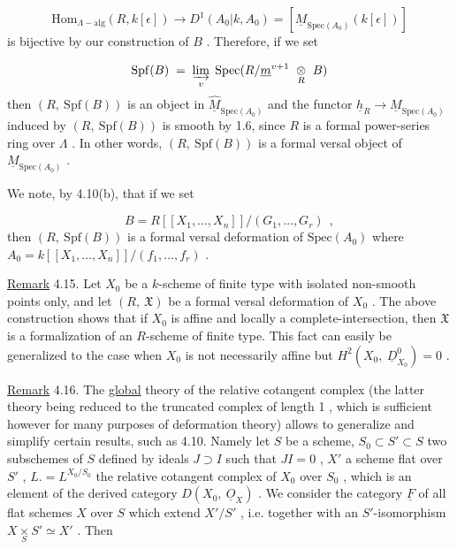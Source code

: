 \begin{equation*}
\mathrm{Hom}_{\Lambda-\mathrm{alg}}(R, k[\epsilon]) \to D^1(A_0|k, A_0) = [\underline{M}_{\mathrm{Spec}(A_0)}(k[\epsilon])]
\end{equation*}
is bijective by our construction of  $B$  . Therefore, if we set 



\begin{equation*}
 \mathrm{Spf}(B) \;=\; \varinjlim_{v}\; \mathrm{Spec}(R/\underline{m}^{v+1}\ \underset{R}{\otimes}\ B)
\end{equation*}
then  $(R,\ \mathrm{Spf}(B))$  is an object in  $\widehat{\underline{M}}_{\mathrm{Spec}(A_0)}$  and the functor  $\underline{h}_R \to \underline{M}_{\mathrm{Spec}(A_0)}$  induced by  $(R,\ \mathrm{Spf}(B))$  is smooth by 1.6, since  $R$  is a formal power-series ring over  $\Lambda$  . In other words,  $(R,\ \mathrm{Spf}(B))$  is a formal versal object of  $\underline{M}_{\mathrm{Spec}(A_0)}$  .

We note, by 4.10(b), that if we set

\begin{equation*}
B = R[[X_1,\ldots,X_n]]/(G_1,\ldots,G_r)\ \ ,
\end{equation*}
then  $(R,\ \mathrm{Spf}(B))$  is a formal versal deformation of  $\mathrm{Spec}(A_0)$  where  $A_0 = k[[X_1,\ldots,X_n]]/(f_1,\ldots,f_r)$  .

\underline{Remark} 4.15.  Let  $X_0$  be a $k$-scheme of finite type with isolated non-smooth points only, and let  $(R,\ \mathfrak{X})$  be a formal versal deformation of  $X_0$  . The above construction shows that if  $X_0$  is affine and locally a complete-intersection, then  $\mathfrak{X}$  is a formalization of an $R$-scheme of finite type. This fact can easily be generalized to the case when  $X_0$  is not necessarily affine but  $H^2(X_0,\ \underline{D}^0_{X_0}) = 0$  .

\underline{Remark} 4.16.  The \underline{global}  theory of the relative cotangent complex (the latter theory being reduced to the truncated complex of length 1 , which is sufficient however for many purposes of deformation theory) allows to generalize and simplify certain results, such as 4.10. Namely let  $S$  be a scheme,  $S_0 \subset S' \subset S$  two subschemes of  $S$  defined by ideals  $J \supset I$  such that  $JI = 0$  ,  $X'$  a scheme flat over  $S'$  ,  $L. = L^{X_0/S_0}$  the relative cotangent complex of  $X_0$  over  $S_0$  , which is an element of the derived category  $D(X_0,\ \underline{O}_X)$  . We consider the category  $\underline{F}$  of all flat schemes  $X$  over  $S$  which extend  $X'/S'$  , i.e. together with an  $S'$-isomorphism  $X \underset{S}{\times} S' \simeq X'$  . Then

